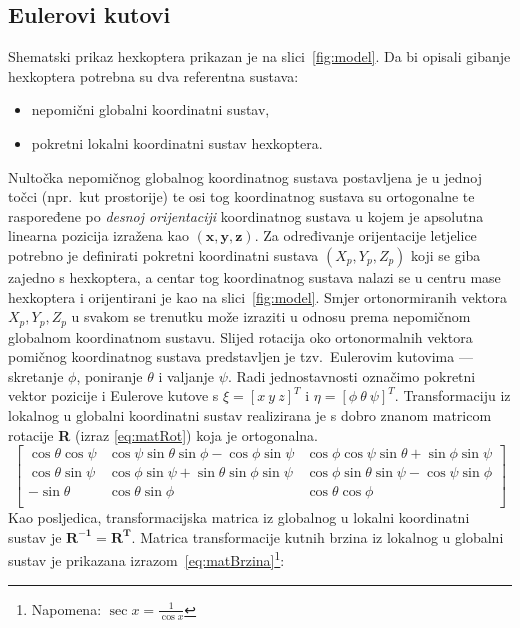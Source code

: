\documentclass[times, utf8, diplomski]{fer}
\begin{document}
{\subsection{Eulerovi kutovi}\label{sec:Euler}
Shematski prikaz hexkoptera prikazan je na slici~\ref{fig:model}. Da bi opisali gibanje hexkoptera potrebna su dva referentna sustava:\begin{itemize}
\item nepomični globalni koordinatni sustav,
\item pokretni lokalni koordinatni sustav hexkoptera.
\end{itemize}
Nultočka nepomičnog globalnog koordinatnog sustava postavljena je u jednoj točci (npr.~kut prostorije) te osi tog koordinatnog sustava su ortogonalne te raspoređene po \emph{desnoj orijentaciji} koordinatnog sustava u kojem je apsolutna linearna pozicija izražena kao $(\mathbf{x,y,z})$. Za određivanje orijentacije letjelice potrebno je definirati pokretni koordinatni sustava $(X_p,Y_p,Z_p)$ koji se giba zajedno s hexkoptera, a centar tog koordinatnog sustava nalazi se u centru mase hexkoptera i orijentirani je kao na slici~\ref{fig:model}. Smjer ortonormiranih vektora $X_p,Y_p,Z_p$ u svakom se trenutku može izraziti u odnosu prema nepomičnom globalnom koordinatnom sustavu. Slijed rotacija oko ortonormalnih vektora pomičnog koordinatnog sustava predstavljen je tzv.~Eulerovim kutovima --- skretanje  $\phi$, poniranje  $\theta$ i valjanje  $\psi$. Radi jednostavnosti označimo pokretni vektor pozicije i Eulerove kutove s $\xi = [x ~y ~z]^T$ i $\eta = [\phi ~\theta ~\psi]^T$. Transformaciju iz  lokalnog u globalni koordinatni sustav realizirana je s dobro znanom matricom rotacije \textbf{R} (izraz \ref{eq:matRot}) koja je ortogonalna.
\begin{equation}
	\begin{bmatrix}
	\cos\theta\cos\psi & \cos\psi\sin\theta\sin\phi-\cos\phi\sin\psi & \cos\phi\cos\psi\sin\theta+\sin\phi\sin\psi \\
	\cos\theta\sin\psi & \cos\phi\sin\psi+\sin\theta\sin\phi\sin\psi & \cos\phi\sin\theta\sin\psi-\cos\psi\sin\phi \\
	-\sin\theta & \cos\theta\sin\phi & \cos\theta\cos\phi \\
	\end{bmatrix}
	\label{eq:matRot}
\end{equation}
Kao posljedica, transformacijska matrica iz globalnog u lokalni koordinatni sustav je $\mathbf{R^{-1} = R^{T}}$. Matrica transformacije kutnih brzina iz lokalnog u globalni sustav je prikazana izrazom~\ref{eq:matBrzina}\footnote{Napomena: $\sec x = \frac{1}{\cos x}$}:
}
\end{document}
